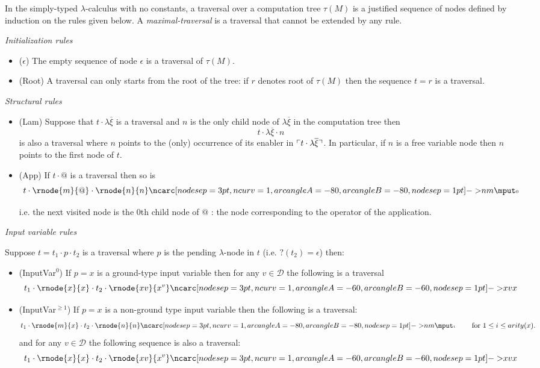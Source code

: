 \begin{dfn}
\label{def:traversal}
In the simply-typed $\lambda$-calculus with no constants,
a traversal over a computation tree $\tau(M)$
is a justified sequence of nodes defined by induction on the rules
given below. A \emph{maximal-traversal} is a traversal that cannot be
extended by any rule.

\emph{Initialization rules}
\begin{itemize}
\item ($\epsilon$) The empty sequence of node $\epsilon$ is a traversal of $\tau(M)$.

\item (Root) A traversal can only starts from the root of the tree: if $r$ denotes root of $\tau(M)$ then the sequence $t = r$
is a traversal.
\end{itemize}


\emph{Structural rules}
\begin{itemize}
\item (Lam) Suppose that $t \cdot \lambda \overline{\xi}$ is a traversal and $n$ is the only child node of $\lambda \overline{\xi}$ in
the computation tree then
$$t \cdot \lambda \overline{\xi} \cdot n$$
is also a traversal
where $n$ points to the (only) occurrence of its enabler in $\ulcorner t \cdot \lambda \overline{\xi} \urcorner$.
In particular, if $n$ is a free variable node then $n$ points to the first node of $t$.

\item (App) If $t \cdot @$ is a traversal then so is
$$t \cdot \rnode{m}{@} \cdot
\rnode{n}{n} \bkptra[nodesep=1pt]{80}{n}{m} \bklabelb{0}
$$

i.e. the next visited node is the $0$th child node of $@$ : the
node corresponding to the operator of the application.
\end{itemize}

\emph{Input variable rules}

Suppose $t = t_1 \cdot p \cdot t_2$ is a traversal where $p$ is the pending $\lambda$-node in $t$ (i.e. $?(t_2)=\epsilon$) then:
\begin{itemize}
\item (InputVar$^0$) If $p = x$ is a ground-type input variable then for any $v \in \mathcal{D}$
the following is a traversal
$$t_1 \cdot \rnode{x}{x} \cdot t_2 \cdot \rnode{xv}{x^v}
\bkptra[nodesep=1pt]{60}{xv}{x}$$


\item (InputVar$^{\geq 1}$) If $p = x$ is a non-ground type input variable then the following is a traversal:
$$t_1 \cdot \rnode{m}{x} \cdot t_2 \cdot
\rnode{n}{n} \bkptra[nodesep=1pt]{80}{n}{m} \bklabelb{i} \qquad
\mbox{ for } 1 \leq i \leq arity(x).$$
and for any $v\in \mathcal{D}$ the following sequence is also a traversal:
$$t_1 \cdot \rnode{x}{x} \cdot t_2 \cdot \rnode{xv}{x^v}
\bkptra[nodesep=1pt]{60}{xv}{x}$$
\end{itemize}


\end{dfn}
